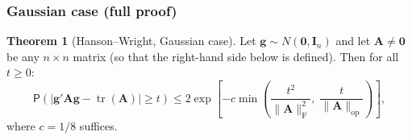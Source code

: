 \documentclass[12pt,a4paper]{article}
\theoremstyle{definition}
\newtheorem{theorem}{Theorem}[section]
\newcommand\prb{\mathsf{P}}
\DeclareMathOperator\tr{tr}
\newcommand{\bI}{\mathbf{I}}
\newcommand{\bzero}{\mathbf{0}}
\newcommand{\bA}{\mathbf{A}}
\newcommand{\bg}{\mathbf{g}}
\newcommand{\opnorm}[1]{\|#1\|_{\mathrm{op}}}
\newcommand{\fnorm}[1]{\|#1\|_{\mathrm{F}}}
\begin{document}
\subsubsection*{Gaussian case (full proof)}

\begin{theorem}[Hanson--Wright, Gaussian case]\label{thm:hanson-wright-gaussian}
Let $\bg \sim N(\bzero, \bI_n)$ and let $\bA \neq \bzero$ be any $n \times n$ matrix (so that the right-hand side below is defined). Then for all $t \geqslant 0$:
\begin{equation}\label{eq:hanson-wright-gaussian}
\prb\!\left(\left|\bg'\bA\bg - \tr(\bA)\right| \geqslant t\right) \leqslant 2\exp\!\left[-c\min\!\left(\frac{t^2}{\fnorm{\bA}^2},\; \frac{t}{\opnorm{\bA}}\right)\right],
\end{equation}
where $c = 1/8$ suffices.
\end{theorem}
\end{document}
